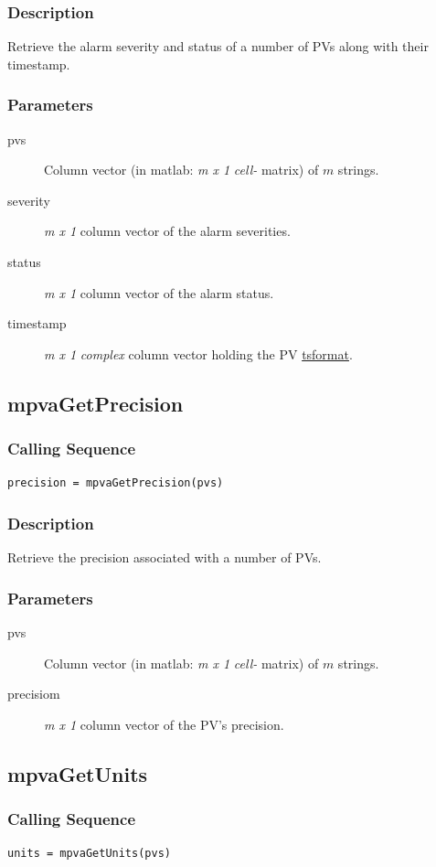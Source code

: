 \documentclass{article}
\newcommand{\pbrk}{\pagebreak[3]}
\newcommand{\ita}[1]{\emph{#1}}
\newcommand{\m}{$m$}
\newcommand{\mhack}{$m$} %
\newcommand{\mxl}{$m\times 1$}
\renewcommand{\m}{\ita{m}}
\newcommand{\mhack}{\ita{m}} %
\renewcommand{\mxl}{\ita{m x 1}}
\renewcommand{\pbrk}{}
\newcommand{\PVITEM}{
\item[pvs] Column vector (in matlab: \mxl{} \ita{cell-} matrix)
of \mhack{} strings.
}
\begin{document}
\subsubsection{Description}
Retrieve the alarm severity and status of a number of PVs along
with their timestamp.
\subsubsection{Parameters}
\begin{description}
\PVITEM
\item[severity] \mxl{} column vector of the alarm severities.
\item[status] \mxl{} column vector of the alarm status.
\item[timestamp] \mxl{} \ita{complex} column vector holding the
PV \hyperref{timestamps}{timestamps (see }{ about the timestamp format)}{tsformat}.
\end{description}


\vspace*{\fill}
\pbrk
\subsection{mpvaGetPrecision}
\subsubsection{Calling Sequence}
\begin{verbatim}
precision = mpvaGetPrecision(pvs)
\end{verbatim}
\subsubsection{Description}
Retrieve the precision associated with a number of PVs.
\subsubsection{Parameters}
\begin{description}
\PVITEM
\item[precisiom] \mxl{} column vector of the PV's precision.
\end{description}

\vspace*{\fill}
\pbrk
\subsection{mpvaGetUnits}
\subsubsection{Calling Sequence}
\begin{verbatim}
units = mpvaGetUnits(pvs)
\end{verbatim}
\end{document}
